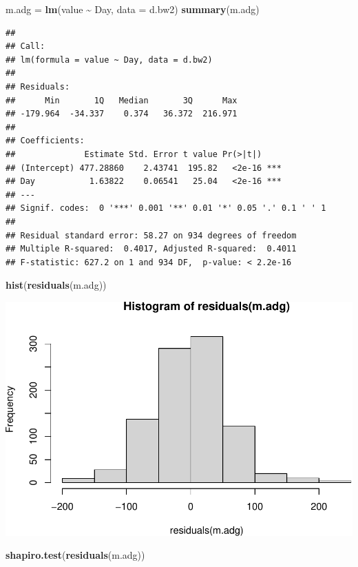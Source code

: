 \documentclass[
]{book}
\newenvironment{Shaded}{\begin{snugshade}}{\end{snugshade}}
\newcommand{\AttributeTok}[1]{\textcolor[rgb]{0.13,0.29,0.53}{#1}}
\newcommand{\FunctionTok}[1]{\textcolor[rgb]{0.13,0.29,0.53}{\textbf{#1}}}
\newcommand{\NormalTok}[1]{#1}
\newcommand{\OtherTok}[1]{\textcolor[rgb]{0.56,0.35,0.01}{#1}}
\newcommand{\SpecialCharTok}[1]{\textcolor[rgb]{0.81,0.36,0.00}{\textbf{#1}}}
\begin{document}
\begin{Shaded}
\begin{Highlighting}[]
\NormalTok{m.adg }\OtherTok{=} \FunctionTok{lm}\NormalTok{(value }\SpecialCharTok{\textasciitilde{}}\NormalTok{ Day, }\AttributeTok{data =}\NormalTok{ d.bw2)}
\FunctionTok{summary}\NormalTok{(m.adg)}
\end{Highlighting}
\end{Shaded}

\begin{verbatim}
## 
## Call:
## lm(formula = value ~ Day, data = d.bw2)
## 
## Residuals:
##      Min       1Q   Median       3Q      Max 
## -179.964  -34.337    0.374   36.372  216.971 
## 
## Coefficients:
##              Estimate Std. Error t value Pr(>|t|)    
## (Intercept) 477.28860    2.43741  195.82   <2e-16 ***
## Day           1.63822    0.06541   25.04   <2e-16 ***
## ---
## Signif. codes:  0 '***' 0.001 '**' 0.01 '*' 0.05 '.' 0.1 ' ' 1
## 
## Residual standard error: 58.27 on 934 degrees of freedom
## Multiple R-squared:  0.4017, Adjusted R-squared:  0.4011 
## F-statistic: 627.2 on 1 and 934 DF,  p-value: < 2.2e-16
\end{verbatim}

\begin{Shaded}
\begin{Highlighting}[]
\FunctionTok{hist}\NormalTok{(}\FunctionTok{residuals}\NormalTok{(m.adg))}
\end{Highlighting}
\end{Shaded}

\includegraphics{bookdown-demo_files/figure-latex/unnamed-chunk-5-1.pdf}

\begin{Shaded}
\begin{Highlighting}[]
\FunctionTok{shapiro.test}\NormalTok{(}\FunctionTok{residuals}\NormalTok{(m.adg))}
\end{Highlighting}
\end{Shaded}
\end{document}
